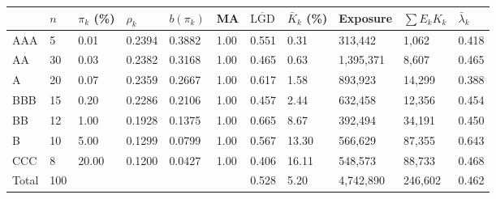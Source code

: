 \begin{tabular}{lllllllllll}
\toprule
 & $n$ & $\pi_k$ (\%) & $\rho_k$ & $b(\pi_k)$ & MA & $\overline{\mathrm{LGD}}$ & $\bar K_k$ (\%) & Exposure & $\sum E_k K_k$ & $\bar\lambda_k$ \\
\midrule
AAA & 5 & 0.01 & 0.2394 & 0.3882 & 1.00 & 0.551 & 0.31 & 313,442 & 1,062 & 0.418 \\
AA & 30 & 0.03 & 0.2382 & 0.3168 & 1.00 & 0.465 & 0.63 & 1,395,371 & 8,607 & 0.465 \\
A & 20 & 0.07 & 0.2359 & 0.2667 & 1.00 & 0.617 & 1.58 & 893,923 & 14,299 & 0.388 \\
BBB & 15 & 0.20 & 0.2286 & 0.2106 & 1.00 & 0.457 & 2.44 & 632,458 & 12,356 & 0.454 \\
BB & 12 & 1.00 & 0.1928 & 0.1375 & 1.00 & 0.665 & 8.67 & 392,494 & 34,191 & 0.450 \\
B & 10 & 5.00 & 0.1299 & 0.0799 & 1.00 & 0.567 & 13.30 & 566,629 & 87,355 & 0.643 \\
CCC & 8 & 20.00 & 0.1200 & 0.0427 & 1.00 & 0.406 & 16.11 & 548,573 & 88,733 & 0.468 \\
Total & 100 &  &  &  &  & 0.528 & 5.20 & 4,742,890 & 246,602 & 0.462 \\
\bottomrule
\end{tabular}
